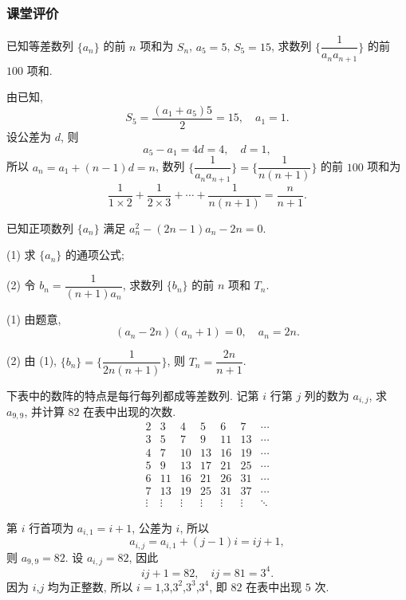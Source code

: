 \subsubsection{课堂评价}
\begin{exercise}
    已知等差数列 $\{a_n\}$ 的前 $n$ 项和为 $S_n$, $a_5=5$, $S_5=15$, 求数列 $\biggl\{\dfrac1{a_na_{n+1}}\biggr\}$ 的前 $100$ 项和.
\end{exercise}
\beginsolution
    由已知,
    \[S_5= \frac{(a_1+a_5)5}2= 15,\quad a_1= 1.\]
    设公差为 $d$, 则
    \[a_5-a_1= 4d=4,\quad d=1,\]
    所以 $a_n= a_1+ (n-1)d= n$, 数列 $\biggl\{\dfrac1{a_na_{n+1}}\biggr\}= \biggl\{\dfrac1{n(n+1)}\biggr\}$ 的前 $100$ 项和为
    \[\frac1{1\times 2}+ \frac1{2\times 3}+ \cdots
    + \frac1{n(n+1)}= \frac{n}{n+1}.\]
\endsolution

\begin{exercise}
    已知正项数列 $\{a_n\}$ 满足 $a_n^2-(2n-1)a_n -2n=0$.
    
    (1) 求 $\{a_n\}$ 的通项公式;
    
    (2) 令 $b_n =\dfrac1{(n+1)a_n}$, 求数列 $\{b_n\}$ 的前 $n$ 项和 $T_n$.
\end{exercise}
\beginsolution
    (1) 由题意,
    \[(a_n- 2n)(a_n+ 1)= 0,\quad a_n= 2n.\]

    (2) 由 (1), $\{b_n\}= \biggl\{\dfrac1{2n(n+1)}\biggr\}$, 则 $T_n= \dfrac{2n}{n+1}$.
\endsolution

\begin{exercise}
    下表中的数阵的特点是每行每列都成等差数列. 记第 $i$ 行第 $j$ 列的数为 $a_{i,j}$, 求 $a_{9,9}$, 并计算 $82$ 在表中出现的次数.
    \[\begin{array}{ccccccc}
        2 &3 &4 &5 &6 &7 & \cdots\\ 
        3 &5 &7 &9 &11 &13 & \cdots\\ 
        4 &7 &10 &13 &16 &19 & \cdots\\
        5 &9 &13 &17 &21 &25 & \cdots\\ 
        6 &11 &16 &21 &26 &31 & \cdots\\
        7 &13 &19 &25 &31 &37 & \cdots\\ 
        \vdots& \vdots& \vdots& \vdots& \vdots& \vdots& \ddots
      \end{array}\]
\end{exercise}
\beginsolution
    第 $i$ 行首项为 $a_{i,1}= i+1$, 公差为 $i$, 所以
    \[a_{i,j}= a_{i,1}+ (j-1)i= ij+1,\]
    则 $a_{9,9}= 82$. 设 $a_{i,j}=82$, 因此
    \[ij+1= 82,\quad ij=81= 3^4.\]
    因为 $i$,$j$ 均为正整数, 所以 $i=1$,$3$,$3^2$,$3^3$,$3^4$, 即 $82$ 在表中出现 $5$ 次.
\endsolution

